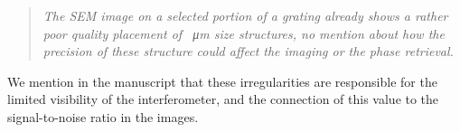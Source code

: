 \documentclass[a4paper,english]{scrartcl}
\newenvironment{reviewerquote}{\begin{quote}\itshape}{\end{quote}}
\begin{document}
\begin{reviewerquote}
    The SEM image on a selected portion of a grating already shows a rather
    poor quality placement of \SI{}{\micro\meter} size structures, no mention about
    how the precision of these structure could affect the imaging or the
    phase retrieval.
\end{reviewerquote}

We mention in the manuscript that these irregularities are responsible for the limited
visibility of the interferometer, and the connection of this value to the signal-to-noise
ratio in the images.



\end{document}
